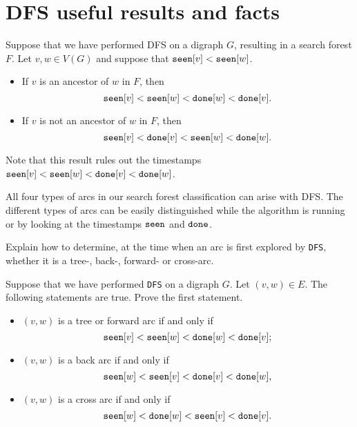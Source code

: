\section{DFS useful results and facts}
\begin{Theorem}
\label{thm:DFS-seen-done}
Suppose that we have performed DFS on a digraph $G$, resulting in a 
search forest $F$. Let $v, w \in V(G)$ and suppose that $\seen[v] < \seen[w]$. 

\begin{itemize}
\item
If $v$ is an ancestor of $w$ in $F$, then 
$$\seen[v] < \seen[w] < \done[w] < \done[v].$$
\item
If $v$ is not an ancestor of $w$ in $F$, then
$$\seen[v] < \done[v]  < \seen[w] < \done[w].$$
\end{itemize}
\end{Theorem}

Note that this result rules out  the timestamps $\seen[v] < \seen[w] < \done[v] < \done[w]$.

All four types of arcs in our search forest classification can
arise with DFS. The different types of arcs can be easily
distinguished while the algorithm is running or by looking at the timestamps 
$\seen$ and $\done$.

\begin{Boxample}[5]
Explain how to determine, at the time when an arc is first explored by
\texttt{DFS}, whether it is a tree-, back-, forward- or cross-arc.
\end{Boxample}

\begin{Boxample}[5] \label{ex:DFS-arc-class}
Suppose that we have performed \texttt{DFS} on a digraph $G$.
 Let $(v, w)\in E$. The following statements are true. Prove the first statement.
\begin{itemize}
  \item $(v, w)$ is a tree or forward arc if and only if  
	$$\seen[v] < \seen[w] < \done[w] < \done[v]\text{;}$$
  \item $(v, w)$ is a back arc if and only if
	$$\seen[w] <  \seen[v] < \done[v] < \done[w]\text{,}$$ 
  \item $(v, w)$ is a cross arc if and only if 
	$$\seen[w] < \done[w]  < \seen[v] < \done[v]\text{.}$$
\end{itemize}
\end{Boxample}

